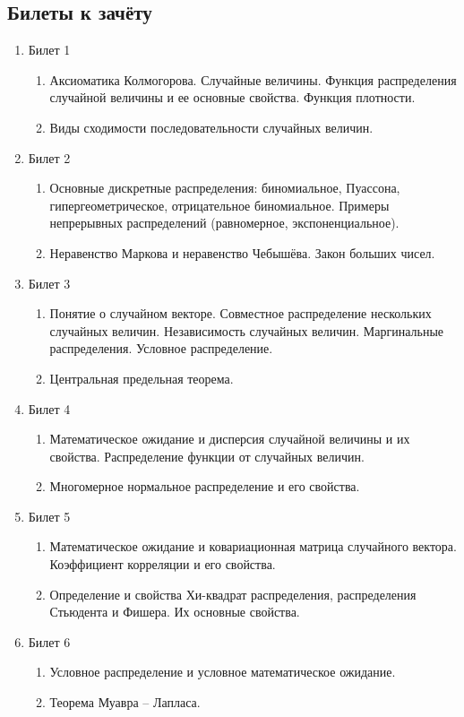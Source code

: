 \subsection{Билеты к зачёту}


\begin{enumerate}


\item Билет 1
\begin{enumerate}
\item Аксиоматика Колмогорова. Случайные величины. Функция
распределения случайной величины и ее основные свойства. Функция
плотности.
\item Виды сходимости последовательности случайных величин.
\end{enumerate}

\item Билет 2
\begin{enumerate}
\item Основные дискретные распределения: биномиальное, Пуассона,
гипергеометрическое, отрицательное биномиальное. Примеры
непрерывных распределений (равномерное, экспоненциальное).
\item Неравенство Маркова и неравенство Чебышёва. Закон больших чисел.
\end{enumerate}


\item Билет 3
\begin{enumerate}
\item Понятие о случайном векторе. Совместное распределение нескольких
случайных величин. Независимость случайных величин. Маргинальные
распределения. Условное распределение.
\item Центральная предельная теорема.
\end{enumerate}


\item Билет 4
\begin{enumerate}
\item Математическое ожидание и дисперсия случайной величины и их
свойства. Распределение функции от случайных величин.
\item Многомерное нормальное распределение и его свойства.
\end{enumerate}

\item Билет 5
\begin{enumerate}
\item Математическое ожидание и ковариационная матрица случайного
вектора. Коэффициент корреляции и его свойства.
\item Определение и свойства Хи-квадрат распределения, распределения Стьюдента и Фишера. Их основные свойства.
\end{enumerate}

\item Билет 6
\begin{enumerate}
\item Условное распределение и условное математическое ожидание.
\item Теорема Муавра – Лапласа.
\end{enumerate}

\end{enumerate}


